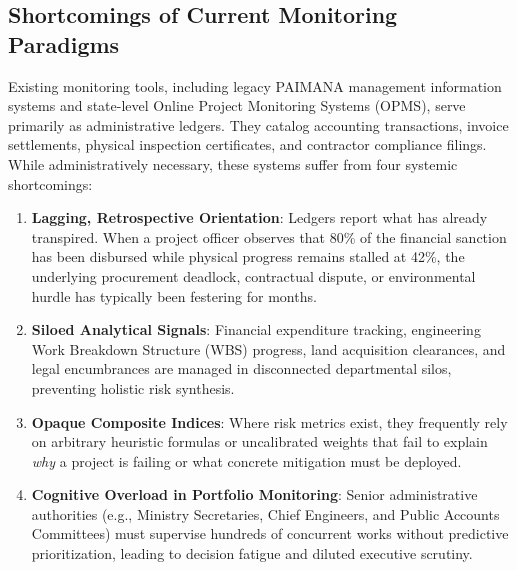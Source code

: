 \documentclass[conference]{IEEEtran}
\begin{document}
\subsection{Shortcomings of Current Monitoring Paradigms}
Existing monitoring tools, including legacy PAIMANA management information systems and state-level Online Project Monitoring Systems (OPMS), serve primarily as administrative ledgers. They catalog accounting transactions, invoice settlements, physical inspection certificates, and contractor compliance filings. While administratively necessary, these systems suffer from four systemic shortcomings:
\begin{enumerate}
    \item \textbf{Lagging, Retrospective Orientation}: Ledgers report what has already transpired. When a project officer observes that 80\% of the financial sanction has been disbursed while physical progress remains stalled at 42\%, the underlying procurement deadlock, contractual dispute, or environmental hurdle has typically been festering for months.
    \item \textbf{Siloed Analytical Signals}: Financial expenditure tracking, engineering Work Breakdown Structure (WBS) progress, land acquisition clearances, and legal encumbrances are managed in disconnected departmental silos, preventing holistic risk synthesis.
    \item \textbf{Opaque Composite Indices}: Where risk metrics exist, they frequently rely on arbitrary heuristic formulas or uncalibrated weights that fail to explain \textit{why} a project is failing or what concrete mitigation must be deployed.
    \item \textbf{Cognitive Overload in Portfolio Monitoring}: Senior administrative authorities (e.g., Ministry Secretaries, Chief Engineers, and Public Accounts Committees) must supervise hundreds of concurrent works without predictive prioritization, leading to decision fatigue and diluted executive scrutiny.
\end{enumerate}
\end{document}
